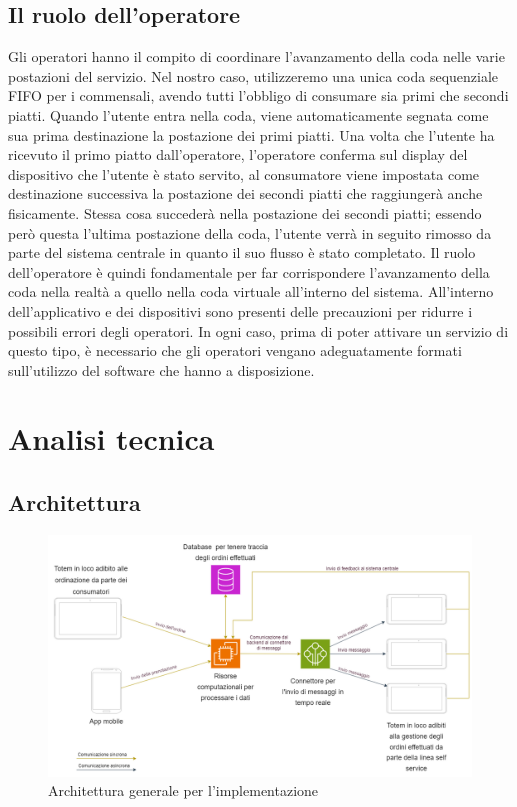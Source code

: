 \documentclass[a4paper, titlepage, 12pt, openright, oneside]{book}
\begin{document}
\subsection{Il ruolo dell'operatore}
Gli operatori hanno il compito di coordinare l'avanzamento della coda nelle varie postazioni del servizio.
Nel nostro caso, utilizzeremo una unica coda sequenziale FIFO per i commensali, avendo tutti l'obbligo di consumare sia primi che secondi piatti.
Quando l'utente entra nella coda, viene automaticamente segnata come sua prima destinazione la postazione dei primi piatti.
Una volta che l'utente ha ricevuto il primo piatto dall'operatore, l'operatore conferma sul display del dispositivo che l'utente è stato servito, al consumatore viene impostata come destinazione successiva la postazione dei secondi piatti che raggiungerà anche fisicamente.
Stessa cosa succederà nella postazione dei secondi piatti; essendo però questa l'ultima postazione della coda, l'utente verrà in seguito rimosso da parte del sistema centrale in quanto il suo flusso è stato completato. Il ruolo dell'operatore è quindi fondamentale per far corrispondere l'avanzamento della coda nella realtà a quello nella coda virtuale all'interno del sistema. All'interno dell'applicativo e dei dispositivi sono presenti delle precauzioni per ridurre i possibili errori degli operatori. In ogni caso, prima di poter attivare un servizio di questo tipo, è necessario che gli operatori vengano adeguatamente formati sull'utilizzo del software che hanno a disposizione.

\section{Analisi tecnica}

\subsection{Architettura}

\begin{figure}[h]
\caption{Architettura generale per l'implementazione}
\includegraphics[scale=0.32]{architettura}
\centering
\end{figure}
\end{document}
